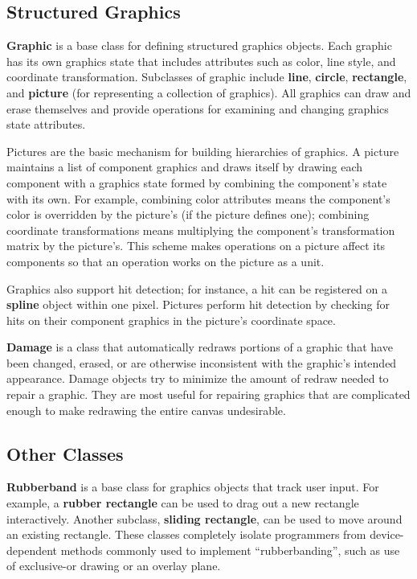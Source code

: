 \subsection{Structured Graphics}
{\bf Graphic} is a base class for defining structured graphics objects.
Each graphic has its own graphics state that includes attributes such as
color, line style, and coordinate transformation.
Subclasses of graphic include {\bf line},
{\bf circle}, {\bf rectangle},
and {\bf picture} (for representing a collection of graphics).  All graphics
can draw and erase themselves and provide operations for
examining and changing graphics state attributes.

Pictures are the basic mechanism for building hierarchies of graphics.  A
picture maintains a list of component graphics and
draws itself by drawing each component
with a graphics state formed by combining the component's state with its own.
For example, combining color
attributes means the component's color is overridden by the picture's 
(if the picture defines one);
combining coordinate transformations means multiplying the
component's transformation matrix by the picture's.
This scheme makes operations on a picture affect its components so that
an operation works on the picture as a unit.

Graphics also support hit detection; for instance, a hit can be
registered on a {\bf spline} object within one pixel.  Pictures perform hit
detection by checking for hits on their component graphics in
the picture's coordinate space.

{\bf Damage} is a class that automatically redraws portions of a graphic
that have been changed, erased, or are otherwise inconsistent with the
graphic's intended appearance.  Damage objects try to minimize the amount of
redraw needed to repair a graphic.  They are most useful for repairing
graphics that are complicated enough to make redrawing the entire canvas
undesirable.

\subsection{Other Classes}
{\bf Rubberband} is a base class for graphics objects that track
user input.  For example, a {\bf rubber rectangle} can be used
to drag out a new rectangle interactively.  Another subclass,
{\bf sliding rectangle}, can be used to move around an existing rectangle.
These classes completely isolate programmers from device-dependent methods
commonly used to implement ``rubberbanding'', such as
use of exclusive-or drawing or an overlay plane.

